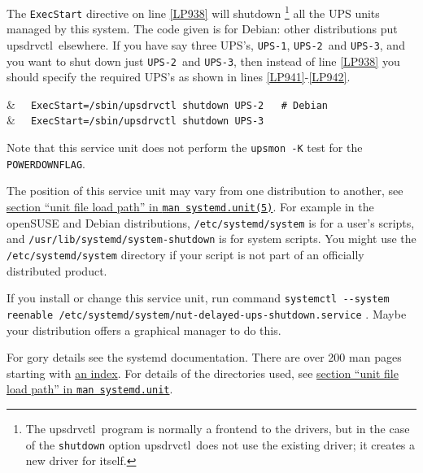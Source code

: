 \documentclass[12pt]{article}
\newcommand{\upsdrvctl}{\mbox{\textcolor{UPSDCOLOUR}{upsdrvctl}}}
\newcommand{\UPSi}{\texttt{UPS-1}}
\newcommand{\UPSii}{\texttt{UPS-2}}
\newcommand{\UPSiii}{\texttt{UPS-3}}
\newcommand{\LINman}[2]{\href{https://man7.org/linux/man-pages/man#2/#1.#2.html}{\texttt{man #1(#2)}}}
\begin{document}
The \texttt{ExecStart} directive on line \ref{LP938} will shutdown
\footnote{The \upsdrvctl\ program is normally a frontend to the
  drivers, but in the case of the \texttt{shutdown} option
  \upsdrvctl\ does not use the existing driver; it creates a new
  driver for itself.}  all the UPS units managed by this system.  The
code given is for Debian: other distributions put
\upsdrvctl\ elsewhere.  If you have say three UPS's, \UPSi,
\UPSii\ and \UPSiii, and you want to shut down just \UPSii\ and
\UPSiii, then instead of line \ref{LP938} you should specify the
required UPS's as shown in lines \ref{LP941}-\ref{LP942}.

\begin{LinePrinter}[0.9\LinePrinterwidth]
\Clunk[LP941]  & \verb`  ExecStart=/sbin/upsdrvctl shutdown UPS-2   # Debian` \\
\Clunk[LP942]  & \verb`  ExecStart=/sbin/upsdrvctl shutdown UPS-3` \\
\end{LinePrinter}

Note that this service unit does not perform the \texttt{upsmon -K}
test for the \texttt{POWERDOWNFLAG}.

The position of this service unit may vary from one distribution to
another, see
\href{https://www.freedesktop.org/software/systemd/man/systemd.unit.html}{section
  ``unit file load path'' in \LINman{systemd.unit}{5}}.  For example
in the openSUSE and Debian distributions,
\texttt{/etc{\allowbreak}/systemd{\allowbreak}/system} is for a user's
scripts, and
\texttt{/usr{\allowbreak}/lib{\allowbreak}/systemd{\allowbreak}/system-shutdown}
is for system scripts.  You might use the
\texttt{/etc{\allowbreak}/systemd{\allowbreak}/system} directory if
your script is not part of an officially distributed product.

If you install or change this service unit, run command \texttt{systemctl
  -\/-system reenable
  /etc/{\allowbreak}systemd/{\allowbreak}system/{\allowbreak}nut-delayed-ups-shutdown{\allowbreak}.service} .
Maybe your distribution offers a graphical manager to do this.

For gory details see the systemd documentation.  There are over 200 man pages
starting with \href{https://www.freedesktop.org/software/systemd/man/}{an
  index}.  For details of the directories used, see 
\href{https://www.freedesktop.org/software/systemd/man/systemd.unit.html}{section
  ``unit file load path'' in \texttt{man systemd.unit}}.

\end{document}
